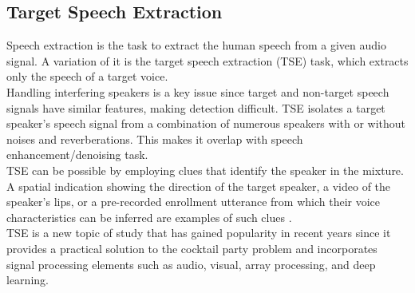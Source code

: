 \subsection{Target Speech Extraction}
Speech extraction is the task to extract the human speech from a given audio signal. A variation of it is the target speech extraction (TSE) task, which extracts only the speech of a target voice. \\
Handling interfering speakers is a key issue since target and non-target speech signals have similar features, making detection difficult. TSE isolates a target speaker's speech signal from a combination of numerous speakers with or without noises and reverberations. This makes it overlap with speech enhancement/denoising task. \\
TSE can be possible by employing clues that identify the speaker in the mixture. A spatial indication showing the direction of the target speaker, a video of the speaker's lips, or a pre-recorded enrollment utterance from which their voice characteristics can be inferred are examples of such clues \cite{zmolikova2023}. \\
TSE is a new topic of study that has gained popularity in recent years since it provides a practical solution to the cocktail party problem \cite{bronkhorst2015} and incorporates signal processing elements such as audio, visual, array processing, and deep learning.
